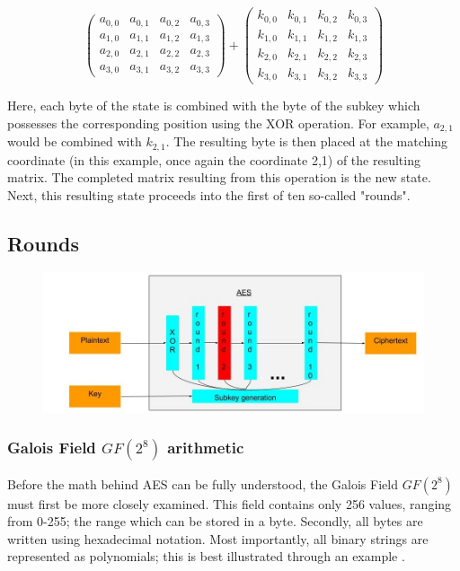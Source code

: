 \documentclass[12pt]{report}
\begin{document}
\[ 
\left( \begin{array}{cccc}
a_{0,0} & a_{0,1} & a_{0,2} & a_{0,3} \\
a_{1,0} & a_{1,1} & a_{1,2} & a_{1,3} \\
a_{2,0} & a_{2,1} & a_{2,2} & a_{2,3} \\
a_{3,0} & a_{3,1} & a_{3,2} & a_{3,3}\end{array} \right)
+
\left( \begin{array}{cccc}
k_{0,0} & k_{0,1} & k_{0,2} & k_{0,3} \\
k_{1,0} & k_{1,1} & k_{1,2} & k_{1,3} \\
k_{2,0} & k_{2,1} & k_{2,2} & k_{2,3} \\
k_{3,0} & k_{3,1} & k_{3,2} & k_{3,3}\end{array} \right)
\]

Here, each byte of the state is combined with the byte of the subkey which possesses the corresponding position using the XOR operation. For example, $a_{2,1}$ would be combined with $k_{2,1}$. The resulting byte is then placed at the matching coordinate (in this example, once again the coordinate 2,1) of the resulting matrix. The completed matrix resulting from this operation is the new state. Next, this resulting state proceeds into the first of ten so-called "rounds".

\subsection{Rounds}

\begin{figure}[H]
\centering
\includegraphics[scale=0.4]{AES_fig3.jpg}
\end{figure}

\subsubsection{Galois Field $GF(2^8)$ arithmetic}
Before the math behind AES can be fully understood, the Galois Field $GF(2^8)$ must first be more closely examined. This field contains only 256 values, ranging from 0-255; the range which can be stored in a byte. Secondly, all bytes are written using hexadecimal notation. Most importantly, all binary strings are represented as polynomials; this is best illustrated through an example \cite{GFieldExample}.
\end{document}
